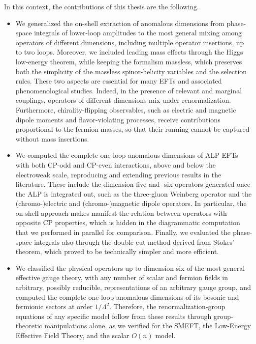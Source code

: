 In this context,
the contributions of this thesis are the following.
\begin{itemize}
    \item We generalized the on-shell extraction of anomalous dimensions from phase-space integrals
    of lower-loop amplitudes to the most general mixing among operators of different dimensions,
    including multiple operator insertions, up to two loops. Moreover, we included leading mass
    effects through the Higgs low-energy theorem, while keeping the formalism massless, which
    preserves both the simplicity of the massless spinor-helicity variables and the selection rules.
    These two aspects are essential
    for many EFTs and associated phenomenological studies. Indeed, in the presence of relevant and marginal
    couplings, operators of different dimensions mix under renormalization. Furthermore,
    chirality-flipping observables, such as electric and magnetic dipole moments and
    flavor-violating processes, receive contributions proportional to the fermion masses, so that
    their running cannot be captured without mass insertions.

    \item We computed the complete one-loop anomalous dimensions of ALP EFTs with both CP-odd and
    CP-even interactions, above and below the electroweak scale, reproducing and extending previous
    results in the literature. These include the dimension-five and -six operators generated once the ALP is
    integrated out, such as the three-gluon Weinberg operator and the (chromo-)electric and (chromo-)magnetic
    dipole operators. In particular, the on-shell approach makes manifest the relation between operators with
    opposite CP properties, which is hidden in the diagrammatic computation that we performed in
    parallel for comparison. Finally, we evaluated the phase-space integrals also through the
    double-cut method derived from Stokes' theorem, which proved to be technically simpler and more
    efficient.

    \item We classified the physical operators up to dimension six of the most general effective
    gauge theory, with any number of scalar and fermion fields in arbitrary, possibly reducible,
    representations of an arbitrary gauge group, and computed the complete one-loop
    anomalous dimensions of its bosonic and fermionic sectors at order $1/\Lambda^2$. Therefore, the
    renormalization-group equations of any specific model follow from these results through group-theoretic
    manipulations alone, as we verified for the SMEFT, the Low-Energy Effective Field Theory, and
    the scalar $O(n)$ model. 


\end{itemize}
